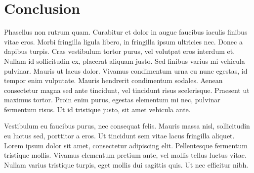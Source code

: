 \chapter{Conclusion}\label{cpt:con}

Phasellus non rutrum quam. Curabitur et dolor in augue faucibus iaculis finibus vitae eros. Morbi fringilla ligula libero, in fringilla ipsum ultricies nec. Donec a dapibus turpis. Cras vestibulum tortor purus, vel volutpat eros interdum et. Nullam id sollicitudin ex, placerat aliquam justo. Sed finibus varius mi vehicula pulvinar. Mauris ut lacus dolor. Vivamus condimentum urna eu nunc egestas, id tempor enim vulputate. Mauris hendrerit condimentum sodales. Aenean consectetur magna sed ante tincidunt, vel tincidunt risus scelerisque. Praesent ut maximus tortor. Proin enim purus, egestas elementum mi nec, pulvinar fermentum risus. Ut id tristique justo, sit amet vehicula ante.

Vestibulum eu faucibus purus, nec consequat felis. Mauris massa nisl, sollicitudin eu luctus sed, porttitor a eros. Ut tincidunt sem vitae lacus fringilla aliquet. Lorem ipsum dolor sit amet, consectetur adipiscing elit. Pellentesque fermentum tristique mollis. Vivamus elementum pretium ante, vel mollis tellus luctus vitae. Nullam varius tristique turpis, eget mollis dui sagittis quis. Ut nec efficitur nibh.
